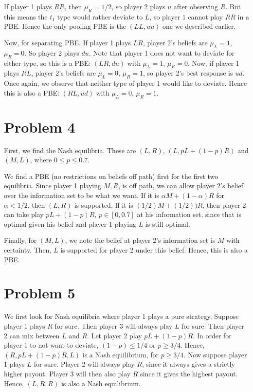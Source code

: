 \documentclass[10pt,letter]{article}
\begin{document}
If player 1 plays $RR$, then $\mu_R = 1/2$, so player 2 plays $u$ after observing $R$. But this means the $t_1$ type would rather deviate to $L$, so player 1 cannot play $RR$ in a PBE. Hence the only pooling PBE is the $(LL, uu)$ one we described earlier.

Now, for separating PBE. If player 1 plays $LR$, player 2's beliefs are $\mu_L = 1$, $\mu_R = 0$. So player 2 plays $du$. Note that player 1 does not want to deviate for either type, so this is a PBE: $(LR, du)$ with $\mu_L = 1$, $\mu_R = 0$. Now, if player 1 plays $RL$, player 2's beliefs are $\mu_L= 0$, $\mu_R = 1$, so player 2's best response is $ud$. Once again, we observe that neither type of player 1 would like to deviate. Hence this is also a PBE: $(RL, ud)$ with $\mu_L = 0$, $\mu_R = 1$.

\section*{Problem 4}
First, we find the Nash equilibria. These are $(L,R)$, $(L, pL + (1-p)R)$ and $(M, L)$, where $0 \le p \le 0.7$.

We find a PBE (no restrictions on beliefs off path) first for the first two equilibria. Since player 1 playing $M,R$, is off path, we can allow player 2's belief over the information set to be what we want. If it is $\alpha M + (1-\alpha) R$ for $\alpha < 1/2$, then $(L,R)$ is supported. If it is $(1/2) M + (1/2))R$, then player 2 can take play $pL + (1-p)R$, $p \in [0, 0.7]$ at his information set, since that is optimal given his belief and player 1 playing $L$ is still optimal.

Finally, for $(M,L)$, we note the belief at player 2's information set is $M$ with certainty. Then, $L$ is supported for player 2 under this belief. Hence, this is also a PBE.

\section*{Problem 5}
We first look for Nash equilibria where player 1 plays a pure strategy. Suppose player 1 plays $R$ for sure. Then player 3 will always play $L$ for sure. Then player 2 can mix between $L$ and $R$. Let player 2 play $pL + (1-p)R$. In order for player 1 to not want to deviate, $(1-p) \le 1/4$ or $p \ge 3/4$. Hence, $(R, pL + (1-p)R, L)$ is a Nash equilibrium, for $p \ge 3/4$. Now suppose player 1 plays $L$ for sure. Player 2 will always play $R$, since it always gives a strictly higher payout. Player 3 will then also play $R$ since it gives the highest payout. Hence, $(L,R,R)$ is also a Nash equilibrium.
\end{document}
